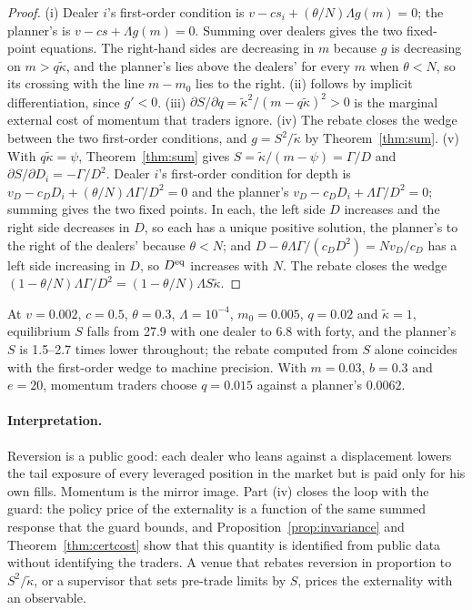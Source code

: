 \documentclass[12pt]{article}
\theoremstyle{definition}
\theoremstyle{remark}
\begin{document}
\begin{proof}
(i) Dealer $i$'s first-order condition is $v-cs_i+(\theta/N)\Lambda g(m)=0$; the planner's is $v-cs+\Lambda g(m)=0$. Summing over dealers gives the two fixed-point equations. The right-hand sides are decreasing in $m$ because $g$ is decreasing on $m>q\tilde\kappa$, and the planner's lies above the dealers' for every $m$ when $\theta<N$, so its crossing with the line $m-m_0$ lies to the right. (ii) follows by implicit differentiation, since $g'<0$. (iii) $\partial S/\partial q=\tilde\kappa^2/(m-q\tilde\kappa)^2>0$ is the marginal external cost of momentum that traders ignore. (iv) The rebate closes the wedge between the two first-order conditions, and $g=S^2/\tilde\kappa$ by Theorem~\ref{thm:sum}. (v) With $q\tilde\kappa=\psi$, Theorem~\ref{thm:sum} gives $S=\tilde\kappa/(m-\psi)=\Gamma/D$ and $\partial S/\partial D_i=-\Gamma/D^2$. Dealer $i$'s first-order condition for depth is $v_D-c_DD_i+(\theta/N)\Lambda\Gamma/D^2=0$ and the planner's $v_D-c_DD_i+\Lambda\Gamma/D^2=0$; summing gives the two fixed points. In each, the left side $D$ increases and the right side decreases in $D$, so each has a unique positive solution, the planner's to the right of the dealers' because $\theta<N$; and $D-\theta\Lambda\Gamma/(c_DD^2)=Nv_D/c_D$ has a left side increasing in $D$, so $D^{\rm eq}$ increases with $N$. The rebate closes the wedge $(1-\theta/N)\Lambda\Gamma/D^2=(1-\theta/N)\Lambda S\tilde\kappa$.
\end{proof}

At $v=0.002$, $c=0.5$, $\theta=0.3$, $\Lambda=10^{-4}$, $m_0=0.005$, $q=0.02$ and $\tilde\kappa=1$, equilibrium $S$ falls from 27.9 with one dealer to 6.8 with forty, and the planner's $S$ is 1.5--2.7 times lower throughout; the rebate computed from $S$ alone coincides with the first-order wedge to machine precision. With $m=0.03$, $b=0.3$ and $e=20$, momentum traders choose $q=0.015$ against a planner's $0.0062$.

\paragraph{Interpretation.} Reversion is a public good: each dealer who leans against a displacement lowers the tail exposure of every leveraged position in the market but is paid only for his own fills. Momentum is the mirror image. Part (iv) closes the loop with the guard: the policy price of the externality is a function of the same summed response that the guard bounds, and Proposition~\ref{prop:invariance} and Theorem~\ref{thm:certcost} show that this quantity is identified from public data without identifying the traders. A venue that rebates reversion in proportion to $S^2/\tilde\kappa$, or a supervisor that sets pre-trade limits by $S$, prices the externality with an observable.
\end{document}
